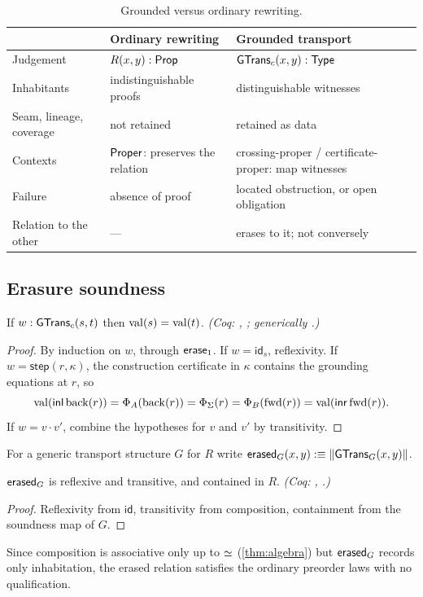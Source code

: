 \begin{table}[t]
\centering\small
\caption{Grounded versus ordinary rewriting.}\label{tab:compare}
\begin{tabularx}{\textwidth}{@{}lYY@{}}
\toprule
 & Ordinary rewriting & Grounded transport \\
\midrule
Judgement & $R(x,y) : \mathsf{Prop}$ & $\mathsf{GTrans}_c(x,y) : \mathsf{Type}$ \\
Inhabitants & indistinguishable proofs & distinguishable witnesses \\
Seam, lineage, coverage & not retained & retained as data \\
Contexts & $\mathsf{Proper}$: preserves the relation & crossing-proper / certificate-proper: map witnesses \\
Failure & absence of proof & located obstruction, or open obligation \\
Relation to the other & --- & erases to it; not conversely \\
\bottomrule
\end{tabularx}
\end{table}

\subsection{Erasure soundness}
\begin{thm}\label{thm:soundness}
If $w : \mathsf{GTrans}_c(s,t)$ then $\mathrm{val}(s) = \mathrm{val}(t)$. \emph{(Coq: , ; generically .)}
\end{thm}
\begin{proof}
By induction on $w$, through $\mathsf{erase}_1$. If $w = \mathsf{id}_s$, reflexivity. If $w = \mathsf{step}(r,\kappa)$, the construction certificate in $\kappa$ contains the grounding equations at $r$, so
\[
\mathrm{val}(\mathsf{inl}\,\mathrm{back}(r)) = \Phi_A(\mathrm{back}(r)) = \Phi_\Sigma(r) = \Phi_B(\mathrm{fwd}(r)) = \mathrm{val}(\mathsf{inr}\,\mathrm{fwd}(r)).
\]
If $w = v \cdot v'$, combine the hypotheses for $v$ and $v'$ by transitivity.
\end{proof}
For a generic transport structure $G$ for $R$ write $\mathsf{erased}_G(x,y) :\equiv \|\mathsf{GTrans}_G(x,y)\|$.
\begin{prop}\label{prop:preorder}
$\mathsf{erased}_G$ is reflexive and transitive, and contained in $R$. \emph{(Coq: , .)}
\end{prop}
\begin{proof}
Reflexivity from $\mathsf{id}$, transitivity from composition, containment from the soundness map of $G$.
\end{proof}
Since composition is associative only up to $\mathrel{\simeq}$ (\cref{thm:algebra}) but $\mathsf{erased}_G$ records only inhabitation, the erased relation satisfies the ordinary preorder laws with no qualification.

